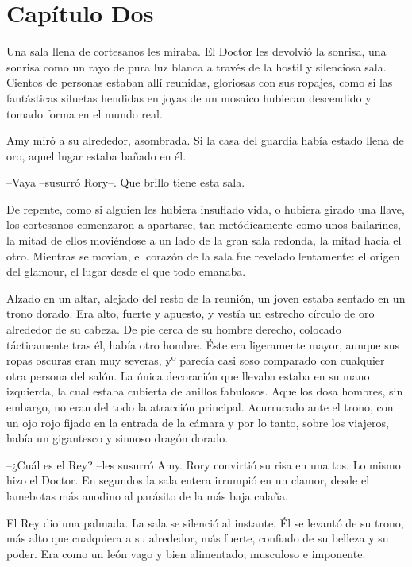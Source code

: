 \chapter*{Capítulo Dos}

{Una sala llena de cortesanos les miraba. El Doctor les devolvió la
	sonrisa, una sonrisa como un rayo de pura luz blanca a través de la
	hostil y silenciosa sala. Cientos de personas estaban allí reunidas,
	gloriosas con sus ropajes, como si las fantásticas siluetas hendidas en
	joyas de un mosaico hubieran descendido y tomado forma en el mundo
real.}

{Amy miró a su alrededor, asombrada. Si la casa del guardia había estado
llena de oro, aquel lugar estaba bañado en él.}

{--Vaya --susurró Rory--. Que brillo tiene esta sala.}

{De repente, como si alguien les hubiera insuflado vida, o hubiera
	girado una llave, los cortesanos comenzaron a apartarse, tan
	metódicamente como unos bailarines, la mitad de ellos moviéndose a un
	lado de la gran sala redonda, la mitad hacia el otro. Mientras se
	movían, el corazón de la sala fue revelado lentamente: el origen del
glamour, el lugar desde el que todo emanaba.}

{Alzado en un altar, alejado del resto de la reunión, un joven estaba
	sentado en un trono dorado. Era alto, fuerte y apuesto, y vestía un
	estrecho círculo de oro alrededor de su cabeza. De pie cerca de su
	hombre derecho, colocado tácticamente tras él, había otro hombre. Éste
	era ligeramente mayor, aunque sus ropas oscuras eran muy severas, yº
	parecía casi soso comparado con cualquier otra persona del salón. La
	única decoración que llevaba estaba en su mano izquierda, la cual estaba
	cubierta de anillos fabulosos. Aquellos dosa hombres, sin embargo, no
	eran del todo la atracción principal. Acurrucado ante el trono, con un
	ojo rojo fijado en la entrada de la cámara y por lo tanto, sobre los
viajeros, había un gigantesco y sinuoso dragón dorado.}

{--¿Cuál es el Rey? --les susurró Amy. Rory convirtió su risa en una
	tos. Lo mismo hizo el Doctor. En segundos la sala entera irrumpió en un
	clamor, desde el lamebotas más anodino al parásito de la más baja
calaña.}

{El Rey dio una palmada. La sala se silenció al instante. Él se levantó
	de su trono, más alto que cualquiera a su alrededor, más fuerte,
	confiado de su belleza y su poder. Era como un león vago y bien
alimentado, musculoso e imponente.}

